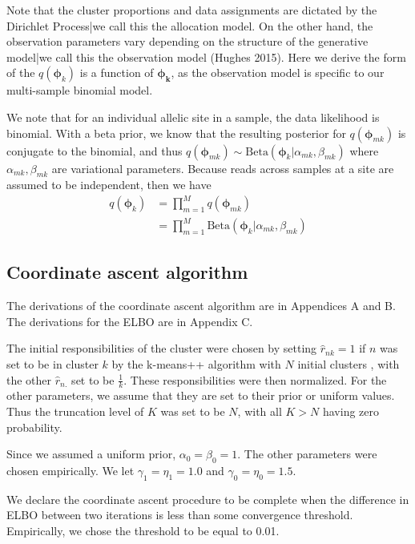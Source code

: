 \documentclass[11pt]{article}
\begin{document}
Note that the cluster proportions and data assignments are dictated by the Dirichlet Process|we call this the allocation model. On the other hand, the observation parameters vary depending on the structure of the generative model|we call this the observation model (Hughes 2015). Here we derive the form of the  $q(\bm{\phi}_k)$ is a function of $\bm{\phi_k}$, as the observation model is specific to our multi-sample binomial model.

We note that for an individual allelic site in a sample, the data likelihood is binomial. With a beta prior, we know that the resulting posterior for $q(\bm{\phi}_{mk})$ is conjugate to the binomial, and thus $q(\bm{\phi}_{mk}) \sim \mathrm{Beta}(\bm{\phi}_k | \alpha_{mk}, \beta_{mk})$ where $\alpha_{mk}, \beta_{mk}$ are variational parameters. Because reads across samples at a site are assumed to be independent, then we have 
\begin{align*}
q(\bm{\phi}_k)  &= \prod\limits_{m=1}^M q(\bm{\phi}_{mk}) \\
				&= \prod\limits_{m=1}^M \mathrm{Beta}(\bm{\phi}_k | \alpha_{mk}, \beta_{mk})
\end{align*}
\newpage
\subsection{Coordinate ascent algorithm}

The derivations of the coordinate ascent algorithm are in Appendices A and B. The derivations for the ELBO are in Appendix C.

The initial responsibilities of the cluster were chosen by setting $\hat{r}_{nk} = 1$ if $n$ was set to be in cluster $k$ by the k-means++ algorithm with $N$ initial clusters \cite{Hughes2015}, with the other $\hat{r}_{n.}$ set to be $\frac{1}{k}$. These responsibilities were then normalized. For the other parameters, we assume that they are set to their prior or uniform values. Thus the truncation level of $K$ was set to be $N$, with all $K > N$ having zero probability.

Since we assumed a uniform prior, $\alpha_0 = \beta_0 = 1$. The other parameters were chosen empirically. We let $\gamma_1 = \eta_1 = 1.0$ and $\gamma_0 = \eta_0 = 1.5$.

We declare the coordinate ascent procedure to be complete when the difference in ELBO between two iterations is less than some convergence threshold. Empirically, we chose the threshold to be equal to 0.01. 
\end{document}
